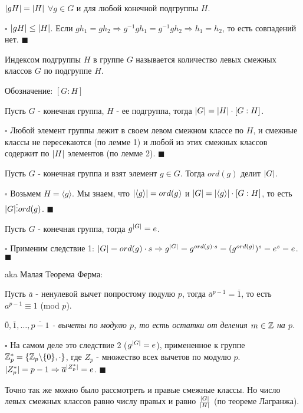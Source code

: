\documentclass[../main.tex]{subfiles}
\begin{document}
\void
{} $\vert gH\vert = \vert H\vert$ $\forall g\in G$ и для любой конечной подгруппы $H$.

\void
$\square$ $\vert gH\vert\leq \vert H\vert$. Если $gh_1 = gh_2 \Rightarrow g^{-1}gh_1 = g^{-1}gh_2
\Rightarrow h_1 = h_2$, то есть совпадений нет. $\blacksquare$

\void
{} Индексом подгруппы $H$ в группе $G$ называется количество левых смежных классов $G$ по подгруппе $H$.

Обозначение: $[G:H]$

\void
{}

Пусть $G$ - конечная группа, $H$ - ее подгруппа, тогда $\vert G\vert = \vert H\vert\cdot [G:H]$.

\void
$\square$ Любой элемент группы лежит в своем левом смежном классе по $H$, и смежные классы не пересекаются
(по лемме 1) и любой из этих смежных классов содержит по $\vert H\vert$ элементов (по лемме 2).
$\blacksquare$

\void
{} Пусть $G$ - конечная группа и взят элемент $g\in G$. Тогда $ord(g)$ делит $\vert G\vert$.

\void
$\square$ Возьмем $H = \langle g\rangle$. Мы знаем, что $\vert \langle g\rangle\vert = ord(g)$ и
$\vert G\vert = \vert \langle g\rangle\vert\cdot [G:H]$, то есть $\vert G\vert\vdots ord(g)$.
$\blacksquare$

\void
{} Пусть $G$ - конечная группа, тогда $g^{\vert G\vert} = e$.

\void
$\square$ Применим следствие 1: $\vert G\vert = ord(g)\cdot s \Rightarrow g^{\vert G\vert} = g^{ord(g)\cdot s} =
(g^{ord(g)})^s = e^s = e$.
$\blacksquare$

\void
{} aka Малая Теорема Ферма:

Пусть $\overline{a}$ - ненулевой вычет попростому подулю $p$, тогда $\overline{a}^{p-1} = \overline{1}$,
то есть $a^{p-1}\equiv 1$ (mod $p$).

\void
\textit{$\overline{0}, \overline{1},\dots,\overline{p-1}$ - вычеты по модулю $p$, то есть остатки от деления
$m\in\mathbb{Z}$ на $p$.}

\void
$\square$ На самом деле это следствие 2 ($g^{\vert G\vert} = e$), примененное к группе 
$\mathbb{Z}_p^* = \{ \mathbb{Z}_p\backslash \{0\}, \cdot \}$, где $Z_p$ - множество всех вычетов по модулю $p$.
$\vert Z_p^*\vert = p - 1 \Rightarrow \overline{a}^{\vert Z_p^*\vert} = e$.
$\blacksquare$

\void
{} Точно так же можно было рассмотреть и правые смежные классы. Но число левых смежных классов
равно числу правых и равно $\frac{\vert G\vert}{\vert H\vert}$ (по теореме Лагранжа).
\end{document}
